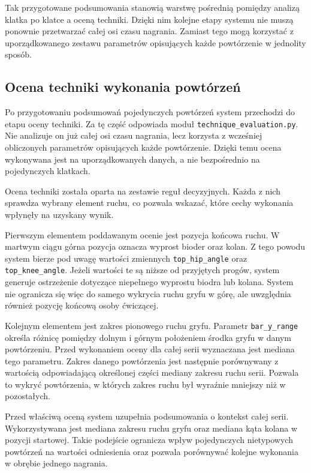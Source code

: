 Tak przygotowane podsumowania stanowią warstwę pośrednią pomiędzy analizą klatka po klatce a oceną techniki. Dzięki nim kolejne etapy systemu nie muszą ponownie przetwarzać całej osi czasu nagrania. Zamiast tego mogą korzystać z uporządkowanego zestawu parametrów opisujących każde powtórzenie w jednolity sposób.

\subsection{Ocena techniki wykonania powtórzeń}

Po przygotowaniu podsumowań pojedynczych powtórzeń system przechodzi do etapu oceny techniki. Za tę część odpowiada moduł \texttt{technique\_evaluation.py}. Nie analizuje on już całej osi czasu nagrania, lecz korzysta z wcześniej obliczonych parametrów opisujących każde powtórzenie. Dzięki temu ocena wykonywana jest na uporządkowanych danych, a nie bezpośrednio na pojedynczych klatkach.

Ocena techniki została oparta na zestawie reguł decyzyjnych. Każda z nich sprawdza wybrany element ruchu, co pozwala wskazać, które cechy wykonania wpłynęły na uzyskany wynik.

Pierwszym elementem poddawanym ocenie jest pozycja końcowa ruchu. W martwym ciągu górna pozycja oznacza wyprost bioder oraz kolan. Z tego powodu system bierze pod uwagę wartości zmiennych \texttt{top\_hip\_angle} oraz \texttt{top\_knee\_angle}. Jeżeli wartości te są niższe od przyjętych progów, system generuje ostrzeżenie dotyczące niepełnego wyprostu biodra lub kolana. System nie ogranicza się więc do samego wykrycia ruchu gryfu w górę, ale uwzględnia również pozycję końcową osoby ćwiczącej.

Kolejnym elementem jest zakres pionowego ruchu gryfu. Parametr \texttt{bar\_y\_range} określa różnicę pomiędzy dolnym i górnym położeniem środka gryfu w danym powtórzeniu. Przed wykonaniem oceny dla całej serii wyznaczana jest mediana tego parametru. Zakres danego powtórzenia jest następnie porównywany z wartością odpowiadającą określonej części mediany zakresu ruchu serii. Pozwala to wykryć powtórzenia, w których zakres ruchu był wyraźnie mniejszy niż w pozostałych.

Przed właściwą oceną system uzupełnia podsumowania o kontekst całej serii. Wykorzystywana jest mediana zakresu ruchu gryfu oraz mediana kąta kolana w pozycji startowej. Takie podejście ogranicza wpływ pojedynczych nietypowych powtórzeń na wartości odniesienia oraz pozwala porównywać kolejne wykonania w obrębie jednego nagrania.

